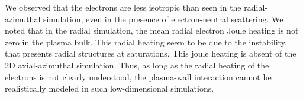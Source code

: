 \vspace{1em}
We observed that the electrons are less isotropic than seen in the radial-azimuthal simulation, even in the presence of electron-neutral scattering.
We noted that in the radial simulation, the mean radial electron Joule heating is not zero in the plasma bulk.
This radial heating seem to be due to the instability, that presents radial structures at saturations.
This joule heating is absent of the \ac{2D} axial-azimuthal simulation.
Thus, as long as the radial heating of the electrons is not clearly understood, the plasma-wall interaction cannot be realistically modeled in such low-dimensional simulations.


